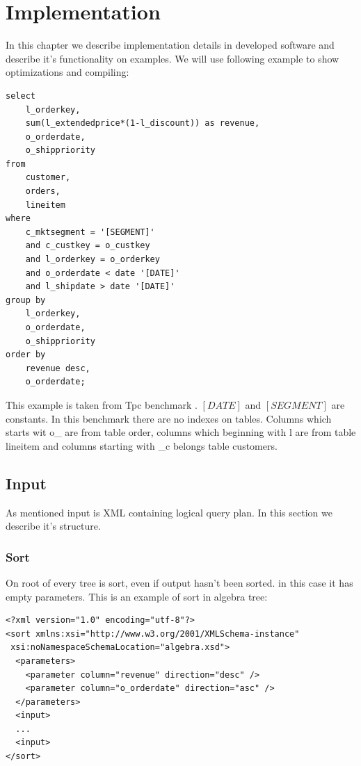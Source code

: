 \chapter{Implementation}

In this chapter we describe implementation details in developed software and describe it's functionality on examples. We will use following example to show optimizations and compiling:


\begin{verbatim}
select
    l_orderkey,
    sum(l_extendedprice*(1-l_discount)) as revenue,
    o_orderdate,
    o_shippriority
from
    customer,
    orders,
    lineitem
where
    c_mktsegment = '[SEGMENT]'
    and c_custkey = o_custkey
    and l_orderkey = o_orderkey
    and o_orderdate < date '[DATE]'
    and l_shipdate > date '[DATE]'
group by
    l_orderkey,
    o_orderdate,
    o_shippriority
order by
    revenue desc,
    o_orderdate;
\end{verbatim}

This example is taken from Tpc benchmark \cite{benchmark}. $[DATE]$ and $[SEGMENT]$ are constants. In this benchmark there are no indexes on tables. Columns which starts wit o\_ are from table order, columns which beginning with l\- are from table lineitem and columns starting with \_c belongs table customers.



\section{Input}

As mentioned input is XML containing logical query plan. In this section we describe it's structure. 

\subsection{Sort}

On root of every tree is sort, even if output hasn't been sorted. in this case it has empty parameters. This is an example of sort in algebra tree:


\begin{lstlisting}
<?xml version="1.0" encoding="utf-8"?>
<sort xmlns:xsi="http://www.w3.org/2001/XMLSchema-instance"
 xsi:noNamespaceSchemaLocation="algebra.xsd">
  <parameters>
    <parameter column="revenue" direction="desc" />
    <parameter column="o_orderdate" direction="asc" />
  </parameters>
  <input>
  ...
  <input>
</sort>
\end{lstlisting}


